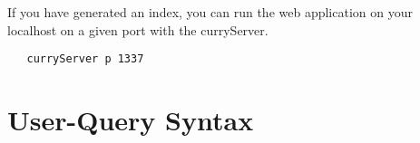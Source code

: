 \documentclass[%
	latex,%
	a4paper,%
	oneside,%
	chapterprefix,%
	headsepline,%
	12pt%
]{scrbook}
\begin{document}
If you have generated an index, you can run the web application on your
localhost on a given port with the curryServer.

\begin{tabbing}\tt
~~curryServer~p~1337
\end{tabbing}

\chapter{User-Query Syntax}\label{syntax}



% 
\end{document}
